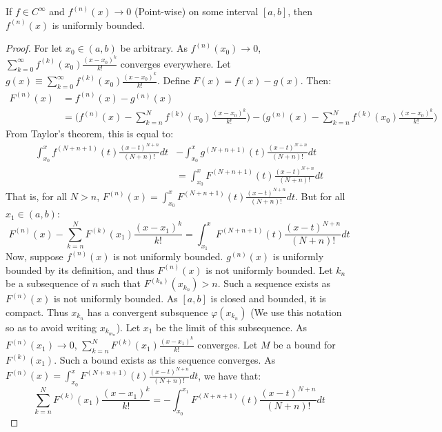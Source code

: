 \documentclass[crop=false,class=book]{standalone}
\begin{document}
\begin{theorem}
If $f\in C^{\infty}$ and $f^{(n)}(x)\rightarrow 0$ (Point-wise) on some interval $[a,b]$, then $f^{(n)}(x)$ is uniformly bounded.
\end{theorem}
\begin{proof}
For let $x_0\in (a,b)$ be arbitrary. As $f^{(n)}(x_0)\rightarrow 0$, $\sum_{k=0}^{\infty} f^{(k)}(x_0)\frac{(x-x_0)^{k}}{k!}$ converges everywhere. Let $g(x)\equiv \sum_{k=0}^{\infty} f^{(k)}(x_0)\frac{(x-x_0)^{k}}{k!}$. Define $F(x) = f(x)-g(x)$. Then:
\begin{align*}
    F^{(n)}(x) &= f^{(n)}(x)-g^{(n)}(x)\\
    &= \bigg(f^{(n)}(x)-\sum_{k=n}^{N} f^{(k)}(x_0)\frac{(x-x_0)^{k}}{k!}\bigg)-\bigg(g^{(n)}(x)-\sum_{k=n}^{N} f^{(k)}(x_0)\frac{(x-x_0)^{k}}{k!}\bigg)    
\end{align*}
From Taylor's theorem, this is equal to:
\begin{align*}
    \int_{x_0}^{x} f^{(N+n+1)}(t)\frac{(x-t)^{N+n}}{(N+n)!}dt &- \int_{x_0}^{x} g^{(N+n+1)}(t)\frac{(x-t)^{N+n}}{(N+n)!}dt\\
    &= \int_{x_0}^{x} F^{(N+n+1)}(t)\frac{(x-t)^{N+n}}{(N+n)!}dt    
\end{align*}
That is, for all $N>n$, $F^{(n)}(x) = \int_{x_0}^{x} F^{(N+n+1)}(t)\frac{(x-t)^{N+n}}{(N+n)!}dt$. But for all $x_1 \in (a,b)$:
\begin{equation*}
    F^{(n)}(x)-\sum_{k=n}^{N} F^{(k)}(x_1)\frac{(x-x_1)^k}{k!} = \int_{x_1}^{x} F^{(N+n+1)}(t)\frac{(x-t)^{N+n}}{(N+n)!}dt    
\end{equation*}
Now, suppose $f^{(n)}(x)$ is not uniformly bounded. $g^{(n)}(x)$ is uniformly bounded by its definition, and thus $F^{(n)}(x)$ is not uniformly bounded. Let ${k_n}$ be a subsequence of $n$ such that $F^{(k_n)}(x_{k_n})>n$. Such a sequence exists as $F^{(n)}(x)$ is not uniformly bounded. As $[a,b]$ is closed and bounded, it is compact. Thus $x_{k_n}$ has a convergent subsquence $\varphi(x_{k_n})$ (We use this notation so as to avoid writing $x_{k_{m_n}}$). Let $x_1$ be the limit of this subsequence. As $F^{(n)}(x_1)\rightarrow 0$, $\sum_{k=n}^{N} F^{(k)}(x_1)\frac{(x-x_1)^k}{k!}$ converges. Let $M$ be a bound for $F^{(k)}(x_1)$. Such a bound exists as this sequence converges. As $F^{(n)}(x) = \int_{x_0}^{x} F^{(N+n+1)}(t)\frac{(x-t)^{N+n}}{(N+n)!}dt$, we have that:
\begin{equation*}
    \sum_{k=n}^{N} F^{(k)}(x_1)\frac{(x-x_1)^k}{k!} = -\int_{x_0}^{x_1} F^{(N+n+1)}(t)\frac{(x-t)^{N+n}}{(N+n)!}dt    
\end{equation*}

\end{proof}
\end{document}
